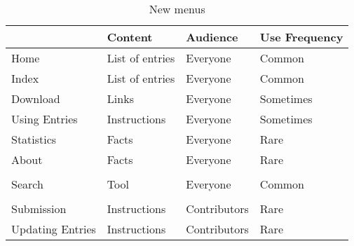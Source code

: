 \documentclass[bsc,frontabs,oneside,singlespacing,parskip,deptreport,logo]{infthesis}
\begin{document}
\begin{table}[h]
\centering
\footnotesize
\begin{tabular}{llll}
\hline
\multicolumn{1}{|l|}{} & \multicolumn{1}{l|}{\textbf{Content}} & \multicolumn{1}{l|}{\textbf{Audience}} & \multicolumn{1}{l|}{\textbf{Use Frequency}} \\ \hline
\multicolumn{1}{|l|}{Home}                   & \multicolumn{1}{l|}{List of entries}  & \multicolumn{1}{l|}{Everyone}          & \multicolumn{1}{l|}{Common}                 \\ \hline
\multicolumn{1}{|l|}{Index}                  & \multicolumn{1}{l|}{List of entries}  & \multicolumn{1}{l|}{Everyone}          & \multicolumn{1}{l|}{Common}                 \\ \hline
\multicolumn{1}{|l|}{Download}               & \multicolumn{1}{l|}{Links}            & \multicolumn{1}{l|}{Everyone}          & \multicolumn{1}{l|}{Sometimes}              \\ \hline
\multicolumn{1}{|l|}{Using Entries}          & \multicolumn{1}{l|}{Instructions}     & \multicolumn{1}{l|}{Everyone}          & \multicolumn{1}{l|}{Sometimes}              \\ \hline
\multicolumn{1}{|l|}{Statistics}             & \multicolumn{1}{l|}{Facts}            & \multicolumn{1}{l|}{Everyone}          & \multicolumn{1}{l|}{Rare}                   \\ \hline
\multicolumn{1}{|l|}{About}                  & \multicolumn{1}{l|}{Facts}            & \multicolumn{1}{l|}{Everyone}          & \multicolumn{1}{l|}{Rare}                   \\ \hline
                                             &                                       &                                        &                                             \\ \hline
\multicolumn{1}{|l|}{Search}                 & \multicolumn{1}{l|}{Tool}             & \multicolumn{1}{l|}{Everyone}          & \multicolumn{1}{l|}{Common}                 \\ \hline
                                             &                                       &                                        &                                             \\ \hline
\multicolumn{1}{|l|}{Submission}             & \multicolumn{1}{l|}{Instructions}     & \multicolumn{1}{l|}{Contributors}      & \multicolumn{1}{l|}{Rare}                   \\ \hline
\multicolumn{1}{|l|}{Updating Entries}       & \multicolumn{1}{l|}{Instructions}     & \multicolumn{1}{l|}{Contributors}      & \multicolumn{1}{l|}{Rare}                   \\ \hline
\end{tabular}
\caption{New menus}
\label{newMenuOrder}
\end{table}
\end{document}
